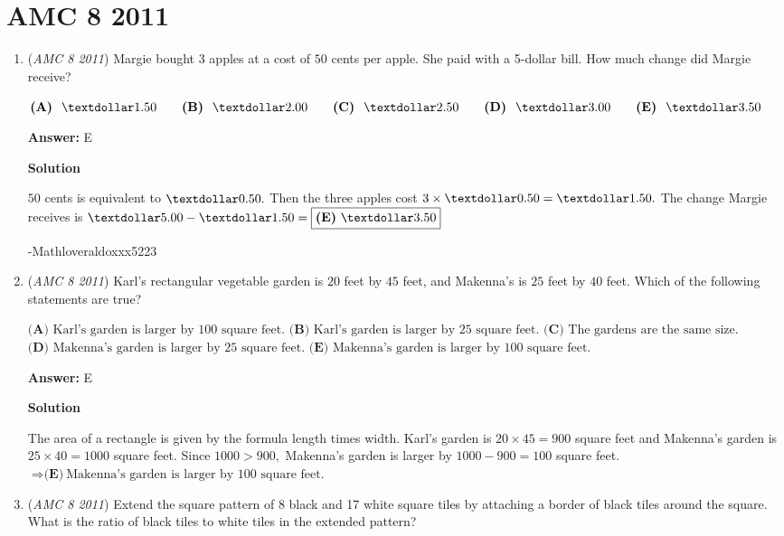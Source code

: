 \section{AMC 8 2011}
        \begin{enumerate}
        	\item (\textit{AMC 8 2011}) Margie bought $3$ apples at a cost of $50$ cents per apple. She paid with a 5-dollar bill. How much change did Margie receive?


 $\textbf{(A) }\ \textdollar 1.50 \qquad \textbf{(B) }\ \textdollar 2.00 \qquad \textbf{(C) }\ \textdollar 2.50 \qquad \textbf{(D) }\ \textdollar 3.00 \qquad \textbf{(E) }\ \textdollar 3.50$

 \textbf{Answer: }E



\textbf{Solution}

$50$ cents is equivalent to $\textdollar 0.50.$ Then the three apples cost $3 \times \textdollar 0.50 = \textdollar 1.50.$ The change Margie receives is $\textdollar 5.00 - \textdollar 1.50 = \boxed{\textbf{(E)}\ \textdollar 3.50}$

 -Mathloveraldoxxx5223

 


	\item (\textit{AMC 8 2011}) Karl's rectangular vegetable garden is $20$ feet by $45$ feet, and Makenna's is $25$ feet by $40$ feet. Which of the following statements are true?


 $\textbf{(A) }\text{Karl's garden is larger by 100 square feet.}$
$\textbf{(B) }\text{Karl's garden is larger by 25 square feet.}$
$\textbf{(C) }\text{The gardens are the same size.}$
$\textbf{(D) }\text{Makenna's garden is larger by 25 square feet.}$
$\textbf{(E) }\text{Makenna's garden is larger by 100 square feet.}$

 \textbf{Answer: }E



\textbf{Solution}

The area of a rectangle is given by the formula length times width. Karl's garden is $20 \times 45 = 900$ square feet and Makenna's garden is $25 \times 40 = 1000$ square feet. Since $1000 > 900,$ Makenna's garden is larger by $1000-900=100$ square feet. $\Rightarrow \boxed{ \textbf{(E)}\ \text{Makenna's garden is larger by 100 square feet.} }$



	\item (\textit{AMC 8 2011}) Extend the square pattern of 8 black and 17 white square tiles by attaching a border of black tiles around the square. What is the ratio of black tiles to white tiles in the extended pattern?



\end{enumerate}
